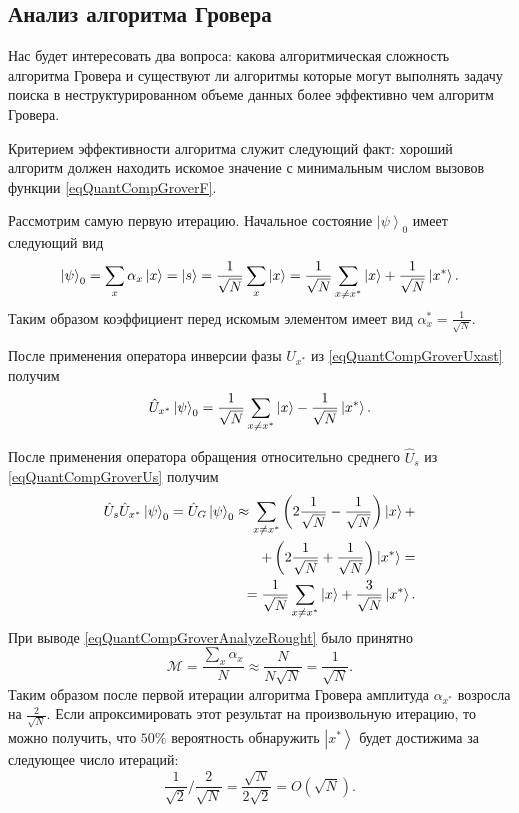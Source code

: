 \subsection{Анализ алгоритма Гровера}

Нас будет интересовать два вопроса: какова алгоритмическая сложность
алгоритма Гровера и существуют ли алгоритмы которые могут выполнять
задачу поиска в неструктурированном объеме данных более эффективно чем
алгоритм Гровера.

Критерием эффективности алгоритма служит следующий факт: хороший
алгоритм должен находить искомое значение с минимальным числом вызовов
функции \eqref{eqQuantCompGroverF}.

Рассмотрим самую первую итерацию. Начальное состояние
$\left|\psi\right>_0$ имеет следующий вид
\begin{equation}
\left|\psi\right>_0 =
\sum_x \alpha_x \ket{x} =  
\ket{s} = 
\frac{1}{\sqrt{N}}\sum_x \ket{x} = 
\frac{1}{\sqrt{N}}\sum_{x\ne x^{\ast}} \ket{x} +
\frac{1}{\sqrt{N}} \left|x^{\ast}\right>.
\nonumber
\end{equation}
Таким образом коэффициент перед искомым элементом имеет вид
$\alpha_x^{\ast} = \frac{1}{\sqrt{N}}$. 

После применения оператора инверсии
фазы $U_{x^{\ast}}$ из \eqref{eqQuantCompGroverUxast} получим
\begin{equation}
\hat{U}_{x^{\ast}} \left|\psi\right>_0 =
\frac{1}{\sqrt{N}}\sum_{x\ne x^{\ast}} \ket{x} - 
\frac{1}{\sqrt{N}} \left|x^{\ast}\right>.
\nonumber
\end{equation}

После применения оператора обращения относительно среднего $\hat{U}_s$ 
из \eqref{eqQuantCompGroverUs} получим
\begin{eqnarray}
\hat{U}_s \hat{U}_{x^{\ast}} \left|\psi\right>_0 = 
\hat{U}_G \left|\psi\right>_0 \approx 
\sum_{x\ne x^{\ast}} \left( 2 \frac{1}{\sqrt{N}} - \frac{1}{\sqrt{N}}
\right) \ket{x} + 
\nonumber \\
+ \left( 2 \frac{1}{\sqrt{N}} +
\frac{1}{\sqrt{N}} \right) \left|x^{\ast}\right> = 
\nonumber \\
= 
\frac{1}{\sqrt{N}}\sum_{x\ne x^{\ast}} \ket{x} + 
\frac{3}{\sqrt{N}} \left|x^{\ast}\right>.
\label{eqQuantCompGroverAnalyzeRought}
\end{eqnarray}
При выводе \eqref{eqQuantCompGroverAnalyzeRought} было принятно 
\[
\mathcal{M} = \frac{\sum_x \alpha_x}{N} \approx
\frac{N}{N \sqrt{N}} = \frac{1}{\sqrt{N}}.
\]
Таким образом после первой итерации алгоритма Гровера амплитуда
$\alpha_{x^{\ast}}$ возросла на $\frac{2}{\sqrt{N}}$. Если
апроксимировать этот результат на произвольную итерацию, то можно
получить, что $50\%$ вероятность обнаружить $\left|x^{\ast}\right>$
будет достижима за следующее число итераций:
\[
\frac{1}{\sqrt{2}}/\frac{2}{\sqrt{N}} =
\frac{\sqrt{N}}{2 \sqrt{2}} = O\left(\sqrt{N}\right).
\]

